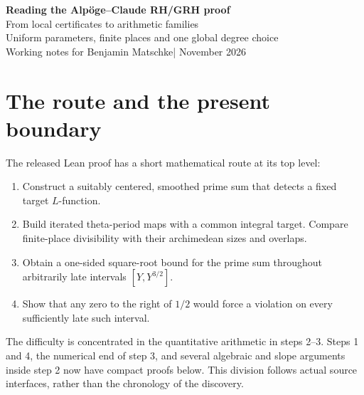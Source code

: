 \documentclass[11pt,a4paper]{article}
\numberwithin{equation}{section}
\theoremstyle{remark}\newtheorem{remark}[theorem]{Remark}
\begin{document}
\begin{center}
{\LARGE\bfseries Reading the Alp\"oge--Claude RH/GRH proof}\\[7pt]
{\large From local certificates to arithmetic families}\\[-1pt]
{\large Uniform parameters, finite places and one global degree choice}\\[8pt]
Working notes for Benjamin Matschke\quad | November 2026
\end{center}

\begingroup\setlength{\fboxsep}{9pt}
\noindent{}\endgroup

\section{The route and the present boundary}

The released Lean proof has a short mathematical route at its top level:
\begin{enumerate}
\item Construct a suitably centered, smoothed prime sum that detects a fixed target $L$-function.
\item Build iterated theta-period maps with a common integral target. Compare finite-place divisibility with their archimedean sizes and overlaps.
\item Obtain a one-sided square-root bound for the prime sum throughout arbitrarily late intervals $[Y,Y^{3/2}]$.
\item Show that any zero to the right of $1/2$ would force a violation on every sufficiently late such interval.
\end{enumerate}
The difficulty is concentrated in the quantitative arithmetic in steps 2--3. Steps 1 and 4, the numerical end of step 3, and several algebraic and slope arguments inside step 2 now have compact proofs below. This division follows actual source interfaces, rather than the chronology of the discovery.
\end{document}
